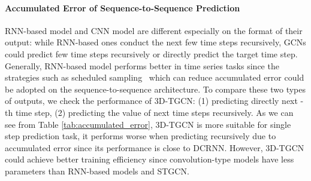 \documentclass{article}
\begin{document}
\paragraph{Accumulated Error of Sequence-to-Sequence Prediction}
RNN-based model and CNN model are different especially on the format of their output: while RNN-based ones conduct the next few time steps recursively, GCNs could predict few time steps recursively or directly predict the target time step.  Generally, RNN-based model performs better in time series tasks since the strategies such as  scheduled sampling~\cite{bengio2015scheduled} which can reduce accumulated error could be adopted on the sequence-to-sequence architecture. To compare these two types of outputs, we check the performance of 3D-TGCN: (1) predicting directly next -th time step, (2) predicting the value of next  time steps recursively. As we can see from Table \ref{tab:accumulated_error}, 3D-TGCN is more suitable for single step prediction task, it performs worse when predicting recursively due to accumulated error since its performance is close to DCRNN. However, 3D-TGCN could achieve better training efficiency since convolution-type models have less parameters than RNN-based models and STGCN.

\begin{table}
	\centering
	\caption{Performance comparison of iteration / no iteration.}
	\label{tab:accumulated_error}
\end{table}
\end{document}
